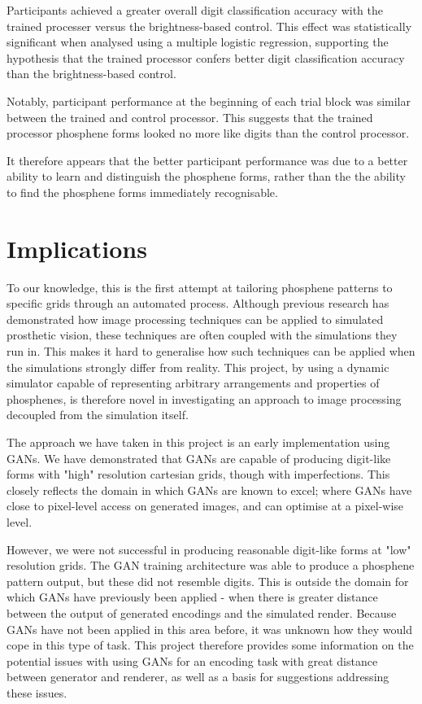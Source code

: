 \documentclass[a4paper,11pt,openany]{book}
\begin{document}
Participants achieved a greater overall digit classification accuracy with the trained processer versus the brightness-based control.
This effect was statistically significant when analysed using a multiple logistic regression, supporting the hypothesis that the trained processor confers better digit classification accuracy than the brightness-based control.

Notably, participant performance at the beginning of each trial block was similar between the trained and control processor.
This suggests that the trained processor phosphene forms looked no more like digits than the control processor.

It therefore appears that the better participant performance was due to a better ability to learn and distinguish the phosphene forms, rather than the the ability to find the phosphene forms immediately recognisable.



\chapter{Implications}
\label{sec:org5c73a85}

To our knowledge, this is the first attempt at tailoring phosphene patterns to specific grids through an automated process.
Although previous research has demonstrated how image processing techniques can be applied to simulated prosthetic vision, these techniques are often coupled with the simulations they run in.
This makes it hard to generalise how such techniques can be applied when the simulations strongly differ from reality.
This project, by using a dynamic simulator capable of representing arbitrary arrangements and properties of phosphenes, is therefore novel in investigating an approach to image processing decoupled from the simulation itself.

The approach we have taken in this project is an early implementation using GANs.
We have demonstrated that GANs are capable of producing digit-like forms with "high" resolution cartesian grids, though with imperfections.
This closely reflects the domain in which GANs are known to excel; where GANs have close to pixel-level access on generated images, and can optimise at a pixel-wise level.

However, we were not successful in producing reasonable digit-like forms at "low" resolution grids.
The GAN training architecture was able to produce a phosphene pattern output, but these did not resemble digits.
This is outside the domain for which GANs have previously been applied - when there is greater distance between the output of generated encodings and the simulated render.
Because GANs have not been applied in this area before, it was unknown how they would cope in this type of task.
This project therefore provides some information on the potential issues with using GANs for an encoding task with great distance between generator and renderer, as well as a basis for suggestions addressing these issues.
\end{document}
